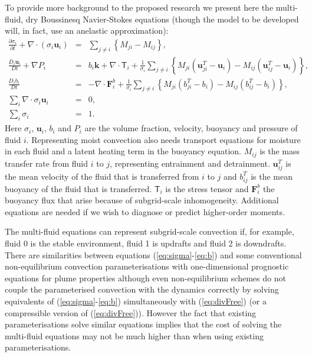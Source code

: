 \documentclass[11pt,a4paper]{article}
\begin{document}
To provide more background to the proposed research we present here the
multi-fluid, dry Boussinesq Navier-Stokes equations \cite[approximated by][]{WMS20} (though the model to be developed will, in fact,
use an anelastic approximation):
\begin{eqnarray}
\frac{\partial\sigma_{i}}{\partial t}+\nabla\cdot(\sigma_{i}\mathbf{u}_{i}) & = & {\textstyle\sum}_{j\ne i}\left\{ M_{ji}-M{}_{ij}\right\} ,\label{eq:sigma}\\
\frac{D_{i}\mathbf{u}_{i}}{Dt}+\nabla P_{i} & = & b_{i}\mathbf{k}+\nabla\cdot \mathsf{T}_i +\frac{1}{\sigma_{i}}{\textstyle\sum}_{j\ne i}\left\{ M_{ji}\left(\mathbf{u}_{ji}^{T}-\mathbf{u}_{i}\right)-M_{ij}\left(\mathbf{u}_{ij}^{T}-\mathbf{u}_{i}\right)\right\} , \label{eq:mom}\\
\frac{D_{i}b_{i}}{Dt} & = & -\nabla\cdot \mathbf{F}^b_{i} +\frac{1}{\sigma_{i}}{\textstyle\sum}_{j\ne i}\left\{ M_{ji}\left(b_{ji}^{T}-b_{i}\right)-M_{ij}\left(b_{ij}^{T}-b_{i}\right)\right\} , \label{eq:b}\\
{\textstyle\sum}_{i}\nabla\cdot\sigma_{i}\mathbf{u}_{i} & = & 0 , \label{eq:divFree}\\
{\textstyle\sum}_{i}\sigma_{i} & = & 1.\label{eq:sumOne}
\end{eqnarray}
Here $\sigma_i$, $\mathbf{u}_i$, $b_i$ and $P_i$ are the volume fraction, velocity, buoyancy and pressure of fluid $i$. Representing moist convection also needs transport equations for moisture in each fluid and a latent heating term in the buoyancy equation. $M_{ij}$ is the mass transfer rate from fluid $i$ to $j$, representing entrainment and detrainment. $\mathbf{u}_{ij}^T$ is the mean velocity of the fluid that is transferred from $i$ to $j$ and $b_{ij}^T$ is the mean buoyancy of the fluid that is transferred. 
$\mathsf{T}_i$ is the stress tensor and $\mathbf{F}^b_{i}$ the buoyancy flux that arise because of subgrid-scale inhomogeneity.
Additional equations are needed if we wish to diagnose or predict higher-order moments.

The multi-fluid equations can represent subgrid-scale convection if, for example, fluid 0 is the stable environment, fluid 1 is updrafts and fluid 2 is downdrafts. There are similarities between equations (\ref{eq:sigma}-\ref{eq:b}) and some conventional non-equilibrium convection parameterisations with one-dimensional prognostic equations for plume properties \cite[e.g.][]{GG05} although even non-equilibrium schemes do not couple the parameterised convection with the dynamics correctly by solving equivalents of (\ref{eq:sigma}-\ref{eq:b})  simultaneously with (\ref{eq:divFree}) (or a compressible version of (\ref{eq:divFree})). However the fact that existing parameterisations solve similar equations implies that the cost of solving the multi-fluid equations may not be much higher than when using existing parameterisations.
\end{document}
